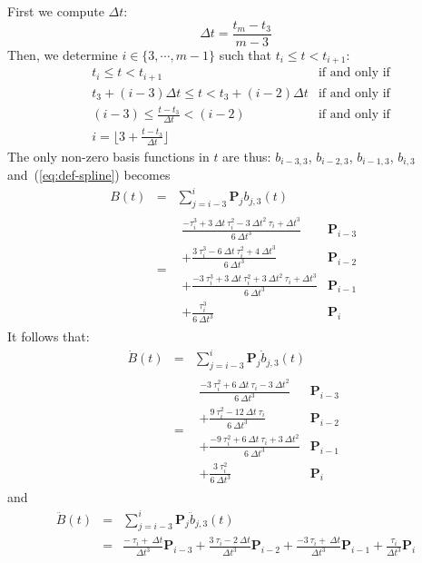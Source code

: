\documentclass{article}
\begin{document}
First we compute $\Delta t$:
$$
\Delta t = \frac{t_m - t_3}{m-3}
$$
Then, we determine $i\in\{3,\cdots,m-1\}$ such that $t_i \leq t < t_{i+1}$:
\begin{eqnarray*}
&t_i \leq t < t_{i+1} & \mbox{if and only if} \\
&t_3+(i-3)\Delta t \leq t < t_3+(i-2)\Delta t & \mbox{if and only if}\\
&(i-3) \leq \frac{t-t_3}{\Delta t} < (i-2) & \mbox{if and only if}\\
& i = \lfloor 3+\frac{t-t_3}{\Delta t} \rfloor
\end{eqnarray*}
The only non-zero basis functions in $t$ are thus: $b_{i-3,3}$, $b_{i-2,3}$, $b_{i-1,3}$, $b_{i,3}$ and~(\ref{eq:def-spline}) becomes
\begin{eqnarray*}
  B(t) &=& \sum_{j=i-3}^{i} \textbf{P}_j b_{j,3}(t) \\
&=& \begin{array}{ll}\frac{-\tau_{i}^3 + 3\ \Delta t\ \tau_{i}^2 - 3\ \Delta t^2\ \tau_{i} + \Delta t^3 }{6\ \Delta t^3} & \textbf{P}_{i-3} \\
+ \frac{3\ \tau_{i}^3-6\ \Delta t\ \tau_{i}^2 + 4\ \Delta t^3}{6\ \Delta t^3} & \textbf{P}_{i-2} \\
+ \frac{-3\ \tau_{i}^3 + 3\ \Delta t\ \tau_{i}^2 + 3\ \Delta t^2\ \tau_{i}+\Delta t^3}{6\ \Delta t^3} & \textbf{P}_{i-1}\\
+ \frac{\tau_i^3}{6\ \Delta t^3} & \textbf{P}_{i} \end{array}
\end{eqnarray*}
It follows that:
\begin{eqnarray*}
  \dot{B}(t) &=& \sum_{j=i-3}^{i} \textbf{P}_j \dot{b}_{j,3}(t) \\
&=& \begin{array}{ll}\frac{-3\ \tau_{i}^2 + 6\ \Delta t\ \tau_{i} - 3\ \Delta t^2}{6\ \Delta t^3} & \textbf{P}_{i-3} \\
+ \frac{9\ \tau_{i}^2-12\ \Delta t\ \tau_{i}}{6\ \Delta t^3} & \textbf{P}_{i-2} \\
+ \frac{-9\ \tau_{i}^2 + 6\ \Delta t\ \tau_{i} + 3\ \Delta t^2}{6\ \Delta t^3} & \textbf{P}_{i-1}\\
+ \frac{3\ \tau_i^2}{6\ \Delta t^3} & \textbf{P}_{i} \end{array}
\end{eqnarray*}
and
\begin{eqnarray*}
  \ddot{B}(t) &=& \sum_{j=i-3}^{i} \textbf{P}_j \ddot{b}_{j,3}(t) \\
&=& \frac{-\ \tau_{i} + \ \Delta t}{\Delta t^3} \textbf{P}_{i-3}
+ \frac{3\ \tau_{i}-2\ \Delta t}{\Delta t^3} \textbf{P}_{i-2}
+ \frac{-3\ \tau_{i} + \ \Delta t}{\Delta t^3} \textbf{P}_{i-1}
+ \frac{\tau_i}{\Delta t^3} \textbf{P}_{i}
\end{eqnarray*}
\end{document}
